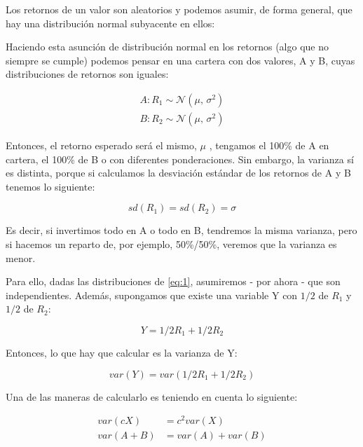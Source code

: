 Los retornos de un valor son aleatorios y podemos asumir, de forma general, que hay una distribución normal subyacente en ellos:


Haciendo esta asunción de distribución normal en los retornos (algo que no siempre se cumple) podemos pensar en una cartera con dos valores, A y B, cuyas distribuciones de retornos son iguales: 

\begin{align} \label{eq:1}
	A: R_{1} \sim  \mathcal{N}(\mu,\,\sigma^{2})\\ 
	B: R_{2} \sim  \mathcal{N}(\mu,\,\sigma^{2})
\end{align}

Entonces, el retorno esperado será el mismo, $\mu$ , tengamos el 100\% de A en cartera, el 100\% de B o con diferentes ponderaciones. Sin embargo, la varianza sí es distinta, porque si calculamos la desviación estándar de los retornos de A y B tenemos lo siguiente: 

\begin{equation}
	sd(R_{1}) = sd(R_{2}) = \sigma
\end{equation}

Es decir, si invertimos todo en A o todo en B, tendremos la misma varianza, pero si hacemos un reparto de, por ejemplo, 50\%/50\%, veremos que la varianza es menor. 

Para ello, dadas las distribuciones de \ref{eq:1}, asumiremos - por ahora - que son independientes. Además, supongamos que existe una variable Y con $1/2$ de $R_{1}$ y $1/2$ de $R_{2}$:

\begin{equation}
	Y = 1/2R_{1} + 1/2R_{2}
\end{equation} 

Entonces, lo que hay que calcular es la varianza de Y:

\begin{equation}
	var(Y) = var(1/2R_{1} + 1/2R_{2})
\end{equation}

Una de las maneras de calcularlo es teniendo en cuenta lo siguiente:

\begin{align}
	var(cX) &= c^{2}var(X)\\
	var(A + B) &= var(A) + var(B)
\end{align}

